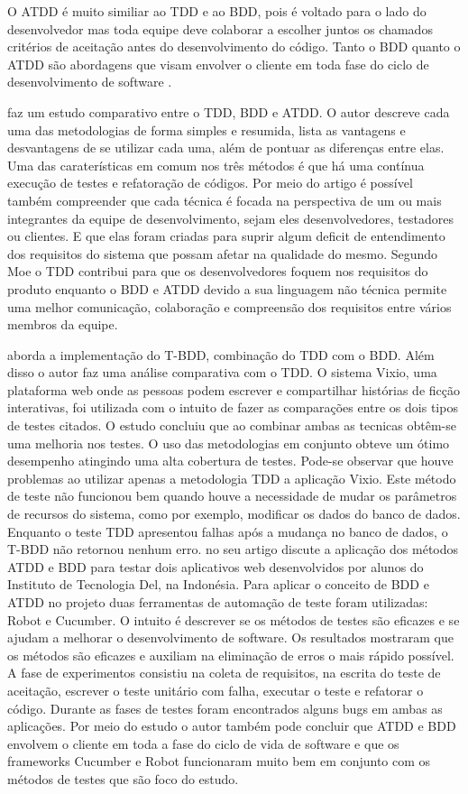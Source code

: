 O ATDD é muito similiar ao TDD e ao BDD, pois é voltado para o lado do desenvolvedor mas toda equipe deve colaborar a escolher juntos os chamados critérios de aceitação antes do desenvolvimento do código. Tanto o BDD quanto o ATDD são abordagens que visam envolver o cliente em toda fase do ciclo de desenvolvimento de software \cite{barus2019implementaion}.

\cite{moe2019comparative} faz um estudo comparativo entre o TDD, BDD e ATDD. O autor descreve cada uma das metodologias de forma simples e resumida, lista as vantagens e desvantagens de se utilizar cada uma, além de pontuar as diferenças entre elas. Uma das caraterísticas em comum nos três métodos é que há uma contínua execução de testes e refatoração de códigos. Por meio do artigo é possível também compreender que cada técnica é focada na perspectiva de um ou mais integrantes da equipe de desenvolvimento, sejam eles desenvolvedores, testadores ou clientes. E que elas foram criadas para suprir algum deficit de entendimento dos requisitos do sistema que possam afetar na qualidade do mesmo. Segundo Moe o TDD contribui para que os desenvolvedores foquem nos requisitos do produto enquanto o BDD e ATDD devido a sua linguagem não técnica permite uma melhor comunicação, colaboração e compreensão dos requisitos entre vários membros da equipe. 

\cite{manuaba2019combination} aborda a implementação do T-BDD, combinação do TDD com o BDD.  Além disso o autor faz uma análise comparativa com o TDD. O sistema Vixio, uma plataforma web onde as pessoas podem escrever e compartilhar histórias de ficção interativas, foi utilizada com o intuito de fazer as comparações entre os dois tipos de testes citados. O estudo concluiu que ao combinar ambas as tecnicas obtêm-se uma melhoria nos testes. O uso das metodologias em conjunto obteve um ótimo desempenho atingindo uma alta cobertura de testes. Pode-se observar que houve problemas ao utilizar apenas a metodologia TDD a aplicação Vixio. Este método de teste não funcionou bem quando houve a necessidade de mudar os parâmetros de recursos do sistema, como por exemplo, modificar os dados do banco de dados. Enquanto o teste TDD apresentou falhas após a mudança no banco de dados, o T-BDD não retornou nenhum erro. 
\cite{barus2019implementaion} no seu artigo discute a aplicação dos métodos ATDD e BDD para testar dois aplicativos web desenvolvidos por alunos do Instituto de Tecnologia Del, na Indonésia. Para aplicar o conceito de BDD e ATDD no projeto duas ferramentas de automação de teste foram utilizadas: Robot e Cucumber. O intuito é descrever se os métodos de testes são eficazes e se ajudam a melhorar o desenvolvimento de software. Os resultados mostraram que os métodos são eficazes e auxiliam na eliminação de erros o mais rápido possível. A fase de experimentos consistiu na coleta de requisitos, na escrita do teste de aceitação, escrever o teste unitário com falha, executar o teste e refatorar o código. Durante as fases de testes foram encontrados alguns bugs em ambas as aplicações. Por meio do estudo o autor também pode concluir que ATDD e BDD envolvem o cliente em toda a fase do ciclo de vida de software e que os frameworks Cucumber e Robot funcionaram muito bem em conjunto com os métodos de testes que são foco do estudo.
